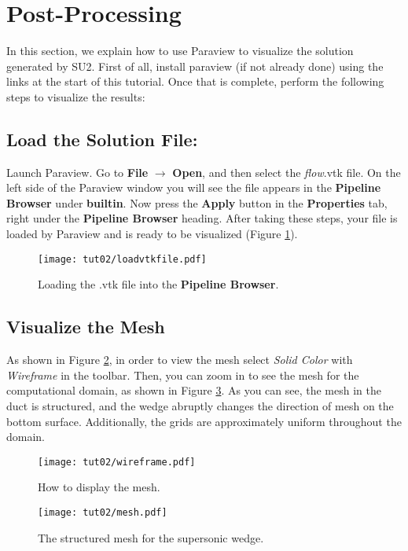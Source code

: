 \section{Post-Processing}
In this section, we explain how to use Paraview to visualize the solution generated by SU2. First of all, install paraview (if not already done) using the links at the start of this tutorial. Once that is complete, perform the following steps to visualize the results:
\subsection{Load the Solution File:}
Launch Paraview. Go to \textbf{File} $\rightarrow$ \textbf{Open}, and then select the \textit{flow}.vtk file. On the left side of the Paraview window you will see the file appears in the \textbf{Pipeline Browser} under \textbf{builtin}. Now press the \textbf{Apply} button in the \textbf{Properties} tab, right under the \textbf{Pipeline Browser} heading. After taking these steps, your file is loaded by Paraview and is ready to be visualized (Figure \ref{fig2:load}).
\begin{figure}[htbp]
    \centering
    \texttt{[image: tut02/loadvtkfile.pdf]}
    \caption{Loading the .vtk file into the \textbf{Pipeline Browser}.}
    \label{fig2:load}
\end{figure}
\subsection{Visualize the Mesh}
As shown in Figure \ref{fig2:wireframe}, in order to view the mesh select \textit{Solid Color} with \textit{Wireframe} in the toolbar. Then, you can zoom in to see the mesh for the computational domain, as shown in Figure \ref{fig2:mesh}. As you can see, the mesh in the duct is structured, and the wedge abruptly changes the direction of mesh on the bottom surface. Additionally, the grids are approximately uniform throughout the domain.
\begin{figure}[htbp]
    \centering
    \texttt{[image: tut02/wireframe.pdf]}
    \caption{How to display the mesh.}
    \label{fig2:wireframe}
\end{figure}
\begin{figure}[htbp]
    \centering
    \texttt{[image: tut02/mesh.pdf]}
    \caption{The structured mesh for the supersonic wedge.}
    \label{fig2:mesh}
\end{figure}
